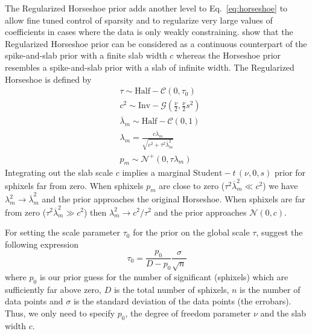 \documentclass[modern]{aastex62}
\begin{document}
The Regularized Horseshoe prior adds another level to Eq.~\ref{eq:horseshoe} to allow fine tuned control of sparsity and to regularize very large values of coefficients in cases where the data is only weakly constraining.
\cite{piironen2017} show that the Regularized Horseshoe prior can be considered as a continuous counterpart of the spike-and-slab prior with a finite slab width $c$ whereas the Horseshoe prior resembles a spike-and-slab prior with a slab of infinite width.
The Regularized Horseshoe is defined by
\begin{equation}
\begin{aligned}
    &\tau  \sim \mathrm{Half}-\mathcal{C}\left(0, \tau_{0}\right)\\
    &c^{2}  \sim \mathrm{Inv}-\mathcal{G}\left(\frac{\nu}{2}, \frac{\nu}{2} s^{2}\right) \\
    &\overline{\lambda}_{m}  \sim \mathrm{Half}-\mathcal{C}(0,1) \\
    &\lambda_{m} =\frac{c \overline{\lambda}_{m}}{\sqrt{c^{2}+\tau^{2} \overline{\lambda}_{m}^{2}}} \\
    &p_{m}  \sim \mathcal{N}^+\left(0, \tau \lambda_{m}\right) 
\end{aligned}
    \label{eq:reg_horseshoe}
\end{equation}
Integrating out the slab scale $c$ implies a marginal $\mathrm{Student}-\mathit{t}\,(\nu,0,s)$ prior for sphixels far from zero.
When sphixels $p_m$ are close to zero ($\tau^2\overline{\lambda}_m^2\ll c^2$) we have $\lambda_m^2\rightarrow\overline{\lambda}_m^2$ and the prior approaches the original Horseshoe.
When sphixels are far from zero ($\tau^2\overline{\lambda}_m^2\gg c^2$) then $\lambda_m^2\rightarrow c^2/\tau^2$ and the prior approaches $\mathcal{N}(0, c)$.

For setting the scale parameter $\tau_0$ for the prior on the global scale $\tau$, \cite{piironen2017} suggest the following expression
\begin{equation}
    \tau_0=\frac{p_0}{D-p_0}\frac{\sigma}{\sqrt{n}}
    \label{eq:horseshoe_tau0}
\end{equation}
where $p_0$ is our prior guess for the number of significant (sphixels) which are sufficiently far above zero, $D$ is the total number of sphixels, $n$ is the number of data points and $\sigma$ is the standard deviation of the data points (the errobars).
Thus, we only need to specify $p_0$, the degree of freedom parameter $\nu$ and the slab width $c$.
\end{document}
